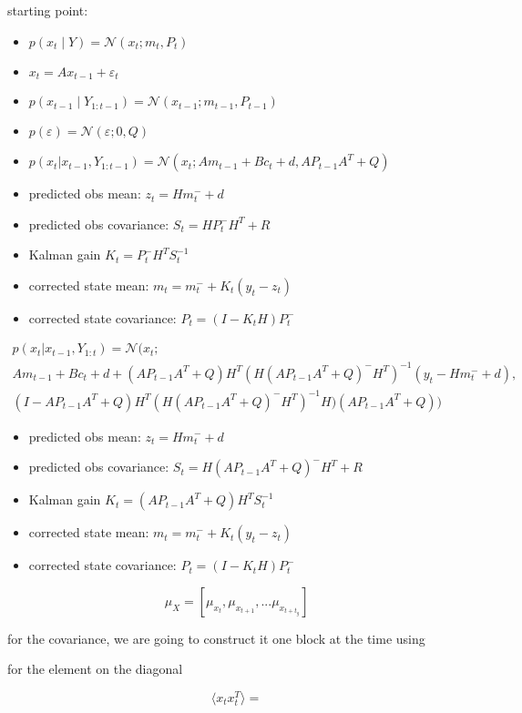 \documentclass{article}
\newcommand{\E}[1]{\langle #1 \rangle} %
\newcommand{\norm}[3]{\mathcal{N}\left(#1; #2, #3\right)}
\begin{document}
starting point:

\begin{itemize}
    \item $p(x_t \mid Y) = \mathcal{N}(x_t; m_t, P_t)$
    \item $x_t = Ax_{t-1} + \varepsilon_t$
    \item $p(x_{t-1}\mid  Y_{1:t-1}) = \norm{x_{t-1}}{m_{t-1}}{P_{t-1}}$
    \item $p(\varepsilon) = \norm{\varepsilon}{0}{Q}$
    
    
    \item $p(x_t | x_{t-1}, Y_{1:t-1}) = \mathcal{N}(x_t;Am_{t-1} + B c_t + d, AP_{t-1}A^T + Q)$ 
    \item predicted obs mean: $z_t = Hm_t^- + d$   
    \item predicted obs covariance: $S_t = HP_t^-H^T + R$
    \item Kalman gain $K_t = P_t^-H^TS_t^{-1}$ 
    \item corrected state mean: $m_t = m_t^- + K_t(y_t - z_t)$ 
    \item corrected state covariance: $P_t = (I-K_tH)P_t^-$ 
\end{itemize}



\begin{multline}
p(x_t | x_{t-1}, Y_{1:t}) = \mathcal{N}(x_t;\\Am_{t-1} + B c_t + d + (AP_{t-1}A^T + Q)H^T(H(AP_{t-1}A^T + Q)^-H^T)^{-1}(y_t - Hm_t^- + d),\\ (I-AP_{t-1}A^T + Q)H^T(H(AP_{t-1}A^T + Q)^-H^T)^{-1}H)(AP_{t-1}A^T + Q))
\end{multline}

\begin{itemize}
    \item predicted obs mean: $z_t = Hm_t^- + d$   
    \item predicted obs covariance: $S_t = H(AP_{t-1}A^T + Q)^-H^T + R$
    \item Kalman gain $K_t = (AP_{t-1}A^T + Q)H^TS_t^{-1}$ 
    \item corrected state mean: $m_t = m_t^- + K_t(y_t - z_t)$ 
    \item corrected state covariance: $P_t = (I-K_tH)P_t^-$ 
\end{itemize}



$$ \mu_X = [\mu_{x_t}, \mu_{x_{t+1}}, ... \mu_{x_{t+t_g}}]$$

for the covariance, we are going to construct it one block at the time using



for the element on the diagonal

$$\E{x_t x_{t}^T} = $$
\end{document}
